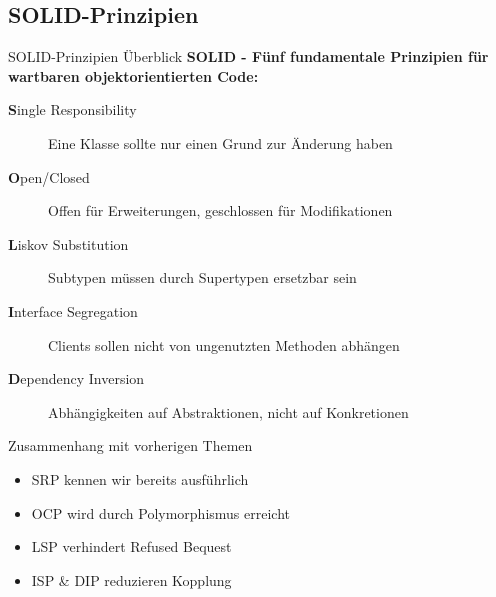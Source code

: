 
\subsection{SOLID-Prinzipien}

\begin{frame}{SOLID-Prinzipien Überblick}
  \textbf{SOLID - Fünf fundamentale Prinzipien für wartbaren objektorientierten Code:}

  \begin{description}
    \item[\textbf{S}ingle Responsibility] Eine Klasse sollte nur einen Grund zur Änderung haben
    \item[\textbf{O}pen/Closed] Offen für Erweiterungen, geschlossen für Modifikationen
    \item[\textbf{L}iskov Substitution] Subtypen müssen durch Supertypen ersetzbar sein
    \item[\textbf{I}nterface Segregation] Clients sollen nicht von ungenutzten Methoden abhängen
    \item[\textbf{D}ependency Inversion] Abhängigkeiten auf Abstraktionen, nicht auf Konkretionen
  \end{description}

  \begin{exampleblock}{Zusammenhang mit vorherigen Themen}
    \begin{itemize}
      \item SRP kennen wir bereits ausführlich
      \item OCP wird durch Polymorphismus erreicht
      \item LSP verhindert Refused Bequest
      \item ISP \& DIP reduzieren Kopplung
    \end{itemize}
  \end{exampleblock}
\end{frame}

